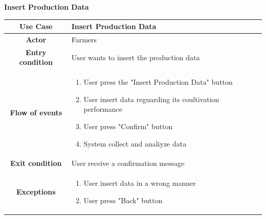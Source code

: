 \documentclass[table, 12pt]{article}
\begin{document}
\begin{itemize}
            
            \begin{table}[H]
                \item[] \textbf{Insert Production Data}
                \item[] 
                \centering
                \begin{tabular}{c m{}}
                    \hline
                    \textbf{Use Case} & Insert Production Data\\ \hline
                    \textbf{Actor} & Farmers\\ \hline
                    \textbf{Entry condition} & User wants to insert the production data\\  \hline
                    \textbf{Flow of events} & \begin{enumerate}
                                                \item User press the "Insert Production Data" button
                                                \item User insert data reguarding its coultivation performance
                                                \item User press "Confirm" button
                                                \item System collect and analiyze data
                                            \end{enumerate}\\ \hline
                    \textbf{Exit condition} & User receive a confirmation message\\ \hline
                    \textbf{Exceptions} &  \begin{enumerate}
                        \item User insert data in a wrong manner
                        \item User press "Back" button
                    \end{enumerate}\\ \hline                    
                \end{tabular}
            \end{table}
            

\end{itemize}
\end{document}
